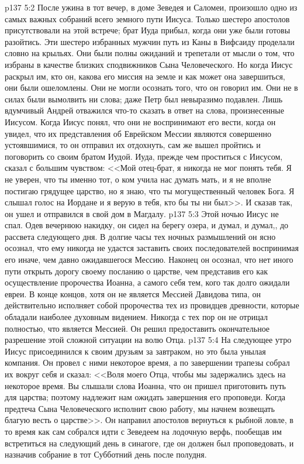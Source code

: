 \vs p137 5:2 После ужина в тот вечер, в доме Зеведея и Саломеи, произошло одно из самых важных собраний всего земного пути Иисуса. Только шестеро апостолов присутствовали на этой встрече; брат Иуда прибыл, когда они уже были готовы разойтись. Эти шестеро избранных мужчин путь из Каны в Вифсаиду проделали словно на крыльях. Они были полны ожиданий и трепетали от мысли о том, что избраны в качестве близких сподвижников Сына Человеческого. Но когда Иисус раскрыл им, кто он, какова его миссия на земле и как может она завершиться, они были ошеломлены. Они не могли осознать того, что он говорил им. Они не в силах были вымолвить ни слова; даже Петр был невыразимо подавлен. Лишь вдумчивый Андрей отважился что\hyp{}то сказать в ответ на слова, произнесенные Иисусом. Когда Иисус понял, что они не воспринимают его вести, когда он увидел, что их представления об Еврейском Мессии являются совершенно устоявшимися, то он отправил их отдохнуть, сам же вышел пройтись и поговорить со своим братом Иудой. Иуда, прежде чем проститься с Иисусом, сказал с большим чувством: <<Мой отец\hyp{}брат, я никогда не мог понять тебя. Я не уверен, что ты именно тот, о ком учила нас думать мать, и я не вполне постигаю грядущее царство, но я знаю, что ты могущественный человек Бога. Я слышал голос на Иордане и я верую в тебя, кто бы ты ни был>>. И сказав так, он ушел и отправился в свой дом в Магдалу.
\vs p137 5:3 Этой ночью Иисус не спал. Одев вечернюю накидку, он сидел на берегу озера, и думал, и думал,, до рассвета следующего дня. В долгие часы тех ночных размышлений он ясно осознал, что ему никогда не удастся заставить своих последователей воспринимая его иначе, чем давно ожидавшегося Мессию. Наконец он осознал, что нет иного пути открыть дорогу своему посланию о царстве, чем представив его как осуществление пророчества Иоанна, а самого себя тем, кого так долго ожидали евреи. В конце концов, хотя он не является Мессией Давидова типа, он действительно исполняет собой пророчества тех из провидцев древности, которые обладали наиболее духовным видением. Никогда с тех пор он не отрицал полностью, что является Мессией. Он решил предоставить окончательное разрешение этой сложной ситуации на волю Отца.
\vs p137 5:4 На следующее утро Иисус присоединился к своим друзьям за завтраком, но это была унылая компания. Он провел с ними некоторое время, а по завершении трапезы собрал их вокруг себя и сказал: <<Воля моего Отца, чтобы мы задержались здесь на некоторое время. Вы слышали слова Иоанна, что он пришел приготовить путь для царства; поэтому надлежит нам ожидать завершения его проповеди. Когда предтеча Сына Человеческого исполнит свою работу, мы начнем возвещать благую весть о царстве>>. Он направил апостолов вернуться к рыбной ловле, в то время как сам собрался идти с Зеведеем на лодочную верфь, пообещав им встретиться на следующий день в синагоге, где он должен был проповедовать, и назначив собрание в тот Субботний день после полудня.
